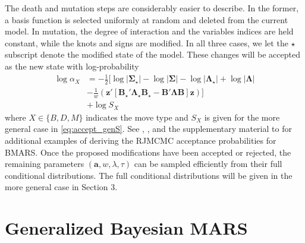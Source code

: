 \documentclass{article} %
\begin{document}
The death and mutation steps are considerably easier to describe. In the former, a basis function is selected uniformly at random and deleted from the current model. In mutation, the degree of interaction and the variables indices are held constant, while the knots and signs are modified. In all three cases, we let the $\star$ subscript denote the modified state of the model. These changes will be accepted as the new state with log-probability
\begin{equation}
\label{eq:accept_gen}
\begin{aligned}
\log\alpha_X &= -\frac{1}{2}\Bigg[\log|\bm\Sigma_\star| - \log|\bm\Sigma| - \log|\bm\Lambda_\star| + \log|\bm\Lambda| \\
& - \frac{1}{w}\left( \bm z'\left[\bm B_\star'\bm\Lambda_\star \bm B_\star - \bm B' \bm\Lambda \bm B\right] \bm z\right)\Bigg]\\
 & + \log S_X
 \end{aligned}
\end{equation}
where $X \in \{B, D, M\}$ indicates the move type and $S_X$ is given for the more general case in \cref{eq:accept_genS}. See \cite{denison1998}, \cite{nott2005}, and the supplementary material to \cite{francom2019} for additional examples of deriving the RJMCMC acceptance probabilities for BMARS.  Once the proposed modifications have been accepted or rejected, the remaining parameters $(\bm a, w, \lambda, \tau)$ can be sampled efficiently from their full conditional distributions. The full conditional distributions will be given in the more general case in Section 3. 

\section{Generalized Bayesian MARS}
\label{sec:GBMARS}
\end{document}
